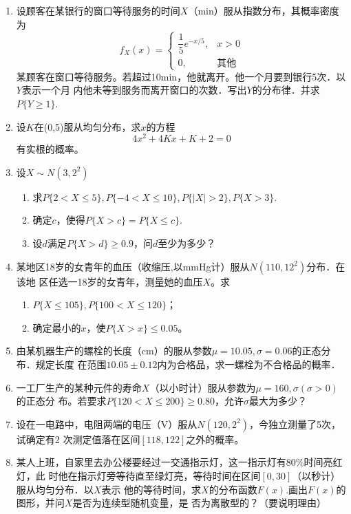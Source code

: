 \begin{enumerate}
    \item 设顾客在某银行的窗口等待服务的时间$X$（min）服从指数分布，其概率密度为
    $$f_X(x)=\left\{
        \begin{array}{ll}
            \dfrac{1}{5}e^{-x/5}, & x>0\\
            0, & \mbox{其他}
        \end{array}
    \right.$$
    某顾客在窗口等待服务。若超过10min，他就离开。他一个月要到银行5次．以$Y$表示一个月
    内他未等到服务而离开窗口的次数．写出$Y$的分布律．并求$P\{Y\geq 1\}$.


    \item 设$K$在(0,5)服从均匀分布，求$x$的方程
    $$4x^2+4Kx+K+2=0$$
    有实根的概率。


    \item 设$X\sim N(3,2^2)$
    \begin{enumerate}
        \item 求$P\{2<X\leq 5\},P\{-4<X\leq 10\},P\{|X|>2\},P\{X>3\}$.
        \item 确定$c$，使得$P\{X>c\}=P\{X\leq c\}$.
        \item 设$d$满足$P\{X>d\}\geq 0.9$，问$d$至少为多少？
    \end{enumerate}


    \item 某地区18岁的女青年的血压（收缩压,以mmHg计）服从$N(110,12^2)$分布．在该地
    区任选一18岁的女青年，测量她的血压$X$。求
    \begin{enumerate}
        \item $P\{X\leq 105\},P\{100<X\leq 120\}$；
        \item 确定最小的$x$，使$P\{X>x\}\leq 0.05$。
    \end{enumerate}


    \item 由某机器生产的螺栓的长度（cm）的服从参数$\mu=10.05,\sigma=0.06$的正态分布．规定长度
    在范围$10.05\pm 0.12$内为合格品，求一螺栓为不合格品的概率．


    \item 一工厂生产的某种元件的寿命$X$（以小时计）服从参数为$\mu=160,\sigma(\sigma >0)$的正态分
    布。若要求$P\{120<X\leq 200\}\geq 0.80$，允许$\sigma$最大为多少？



    \item 设在一电路中，电阻两端的电压（V）服从$N(120,2^2)$，今独立测量了5次，试确定有2
    次测定值落在区间$[118,122]$之外的概率。


    \item 某人上班，自家里去办公楼要经过一交通指示灯，这一指示灯有80\%时间亮红灯，此
    时他在指示灯旁等待直至绿灯亮，等待时间在区间$[0,30]$（以秒计）服从均匀分布．以$X$表示
    他的等待时间，求$X$的分布函数$F(x)$.画出$F(x)$的图形，并问$X$是否为连续型随机变量，是
    否为离散型的？（要说明理由）



\end{enumerate}
